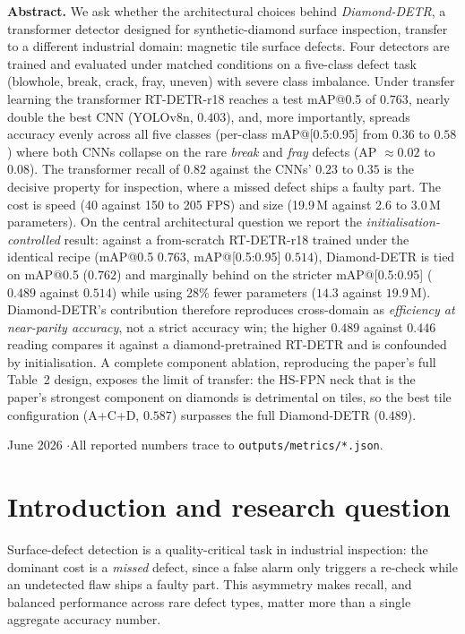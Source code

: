 \documentclass[11pt,a4paper]{article}
\begin{document}
\begin{titlepage}
\begin{minipage}{0.86\textwidth}\small
\textbf{Abstract.} We ask whether the architectural choices behind \emph{Diamond-DETR},
a transformer detector designed for synthetic-diamond surface inspection, transfer to a
different industrial domain: magnetic tile surface defects. Four detectors are trained and
evaluated under matched conditions on a five-class defect task (blowhole, break, crack, fray,
uneven) with severe class imbalance. Under transfer learning the transformer RT-DETR-r18 reaches
a test mAP@0.5 of $0.763$, nearly double the best CNN (YOLOv8n, $0.403$), and, more importantly,
spreads accuracy evenly across all five classes (per-class mAP@[0.5:0.95] from $0.36$ to $0.58$)
where both CNNs collapse on the rare \emph{break} and \emph{fray} defects (AP $\approx 0.02$ to
$0.08$). The transformer recall of $0.82$ against the CNNs' $0.23$ to $0.35$ is the decisive
property for inspection, where a missed defect ships a faulty part. The cost is speed (40 against
150 to 205 FPS) and size (19.9\,M against 2.6 to 3.0\,M parameters). On the central architectural
question we report the \emph{initialisation-controlled} result: against a from-scratch RT-DETR-r18
trained under the identical recipe (mAP@0.5 $0.763$, mAP@[0.5:0.95] $0.514$), Diamond-DETR is tied
on mAP@0.5 ($0.762$) and marginally behind on the stricter mAP@[0.5:0.95] ($0.489$ against $0.514$)
while using 28\% fewer parameters ($14.3$ against $19.9$\,M). Diamond-DETR's contribution therefore
reproduces cross-domain as \emph{efficiency at near-parity accuracy}, not a strict accuracy win; the
higher $0.489$ against $0.446$ reading compares it against a diamond-pretrained RT-DETR and is
confounded by initialisation. A complete component ablation, reproducing the paper's full Table~2 design,
exposes the limit of transfer: the HS-FPN neck that is the paper's strongest component on diamonds is
detrimental on tiles, so the best tile configuration (A+C+D, $0.587$) surpasses the full Diamond-DETR
($0.489$).
\end{minipage}

\vfill
{\small June 2026 \quad$\cdot$\quad All reported numbers trace to \texttt{outputs/metrics/*.json}.}
\end{titlepage}

\tableofcontents
\thispagestyle{empty}
\clearpage

\section{Introduction and research question}
Surface-defect detection is a quality-critical task in industrial inspection: the dominant cost is
a \emph{missed} defect, since a false alarm only triggers a re-check while an undetected flaw ships
a faulty part. This asymmetry makes recall, and balanced performance across rare defect types,
matter more than a single aggregate accuracy number.
\end{document}
